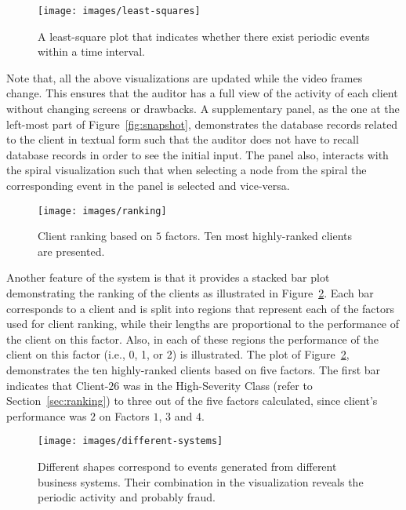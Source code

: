 \documentclass[conference]{IEEEtran}
\begin{document}
\begin{figure}[h!tb]
  \texttt{[image: images/least-squares]}
  \caption{A least-square plot that indicates whether there exist periodic events within a time interval.}
  \label{fig:least-squares}
\end{figure}

Note that, all the above visualizations are updated while the video
frames change. This ensures that the auditor has a full view of the
activity of each client without changing screens or drawbacks. A
supplementary panel, as the one at the left-most part of
Figure~\ref{fig:snapshot}, demonstrates the database records related
to the client in textual form such that the auditor does not have to
recall database records in order to see the initial input. The panel
also, interacts with the spiral visualization such that when
selecting a node from the spiral the corresponding event in the
panel is selected and vice-versa.

\begin{figure}[h!tb]
    \centering
  \texttt{[image: images/ranking]}
  \caption{Client ranking based on $5$ factors. Ten most highly-ranked clients are presented.}
  \label{fig:ranking}
\end{figure}

Another feature of the system is that it provides a stacked bar plot
demonstrating the ranking of the clients as illustrated in
Figure~\ref{fig:ranking}. Each bar corresponds to a client and is
split into regions that represent each of the factors used for
client ranking, while their lengths are proportional to the
performance of the client on this factor. Also, in each of these
regions the performance of the client on this factor (i.e., 0, 1, or
2) is illustrated. The plot of Figure~\ref{fig:ranking},
demonstrates the ten highly-ranked clients based on five factors.
The first bar indicates that Client-$26$ was in the High-Severity
Class (refer to Section~\ref{sec:ranking}) to three out of the five
factors calculated, since client's performance was $2$ on Factors
$1$, $3$ and $4$.

\begin{figure}[h!tb]
  \centering
  \texttt{[image: images/different-systems]}
  \caption{Different shapes correspond to events generated from different business systems.
   Their combination in the visualization reveals the periodic activity and probably fraud.}
  \label{fig:different-systems}
\end{figure}
\end{document}
